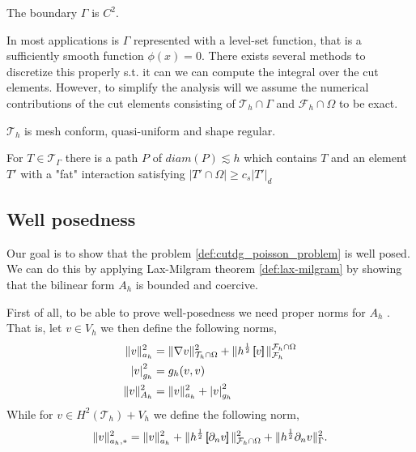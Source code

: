 \begin{assumption}[G1]
    \label{as:G1}
    The boundary $\Gamma $ is $C^{2}$.
\end{assumption}

\begin{remark}
In most applications is $\Gamma $ represented with a level-set function, that is a sufficiently smooth function $\phi ( x)  = 0$. There exists several methods to discretize this properly s.t. it can we can compute the integral over the cut elements.
    However, to simplify the analysis will we assume the numerical contributions of the cut elements consisting of $\mathcal{T}_{h} \cap \Gamma   $ and $\mathcal{F}_{h} \cap \Omega  $ to be exact.
\end{remark}


\begin{assumption}[G1]
    $\mathcal{T}_{h} $ is mesh conform, quasi-uniform and shape regular.
\end{assumption}

\begin{assumption}[G3]
    For $T \in \mathcal{T} _{\Gamma   }$ there is a path $P$ of $diam(P) \lesssim h$ which contains $T$ and an element $T'$ with a "fat" interaction satisfying $\left\lvert T' \cap \Omega  \right\rvert \ge c_{s} \left\lvert T'  \right\rvert _{d}$
\end{assumption}


\subsection{Well posedness}%
\label{sub:well_posedness}

Our goal is to show that the problem \ref{def:cutdg_poisson_problem} is well posed. We can do this by applying Lax-Milgram theorem \ref{def:lax-milgram} by showing that the bilinear form $A_{h}$ is bounded and coercive.

First of all, to be able to prove well-posedness we need proper norms for $A_{h}$ .
That is, let $v \in V_{h}$ we then define the following norms,
\[
\begin{split}
    \| v \|_{ a_{h} }^{ 2 }  & = \| \nabla v \|_{ \mathcal{T} _{h} \cap \Omega  }^{ 2 } + \| h^{\frac{1}{2}} \left[\!\!\left[  v  \right]\!\!\right]   \|_{ \mathcal{F} _{h} }^{ \mathcal{F} _{h} \cap \Omega   } \\
    \left\lvert v \right\rvert _{g_{h}}^{2} & = g_{h}( v,v)  \\
    \| v \|_{ A_{h} }^{ 2 } &= \| v \|_{ a_{h} }^{ 2 } + \left\lvert v \right\rvert_{g_{h}}^{2}     \\
\end{split}
\]
While for $v \in H^2( \mathcal{T} _{h}) + V_{h}$ we define the following norm,\[
\| v \|_{ a_{h},* }^{ 2 } = \| v \|_{ a_{h} }^{ 2 } +   \| h^{\frac{1}{2}} \left[\!\!\left[  \partial _{n} v  \right]\!\!\right]    \|_{  \mathcal{F} _{h} \cap \Omega }^{  2} + \| h^{\frac{1}{2}} \partial _{n} v \|_{ \Gamma  }^{ 2 }.
\]

